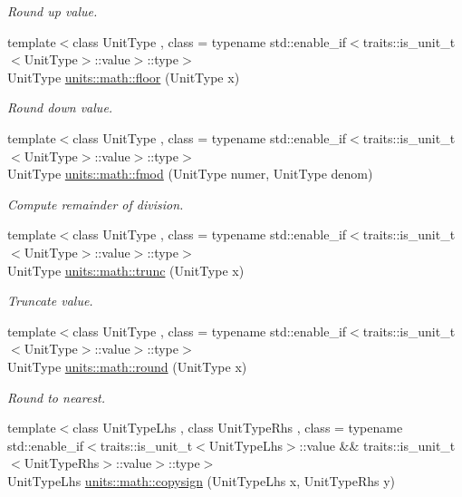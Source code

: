 \begin{DoxyCompactItemize}
\begin{DoxyCompactList}\small\item\em Round up value. \end{DoxyCompactList}\item 
{\footnotesize template$<$class Unit\+Type , class  = typename std\+::enable\+\_\+if$<$traits\+::is\+\_\+unit\+\_\+t$<$\+Unit\+Type$>$\+::value$>$\+::type$>$ }\\Unit\+Type \hyperlink{group___unit_math_ga510fabc531dbfe8ee911a4a255159bd0}{units\+::math\+::floor} (Unit\+Type x)
\begin{DoxyCompactList}\small\item\em Round down value. \end{DoxyCompactList}\item 
{\footnotesize template$<$class Unit\+Type , class  = typename std\+::enable\+\_\+if$<$traits\+::is\+\_\+unit\+\_\+t$<$\+Unit\+Type$>$\+::value$>$\+::type$>$ }\\Unit\+Type \hyperlink{group___unit_math_ga1184575106fc9286c1f3d5f8b1754b80}{units\+::math\+::fmod} (Unit\+Type numer, Unit\+Type denom)
\begin{DoxyCompactList}\small\item\em Compute remainder of division. \end{DoxyCompactList}\item 
{\footnotesize template$<$class Unit\+Type , class  = typename std\+::enable\+\_\+if$<$traits\+::is\+\_\+unit\+\_\+t$<$\+Unit\+Type$>$\+::value$>$\+::type$>$ }\\Unit\+Type \hyperlink{group___unit_math_ga11b5f95c32479536aefd08bba4009121}{units\+::math\+::trunc} (Unit\+Type x)
\begin{DoxyCompactList}\small\item\em Truncate value. \end{DoxyCompactList}\item 
{\footnotesize template$<$class Unit\+Type , class  = typename std\+::enable\+\_\+if$<$traits\+::is\+\_\+unit\+\_\+t$<$\+Unit\+Type$>$\+::value$>$\+::type$>$ }\\Unit\+Type \hyperlink{group___unit_math_ga24ed7e40e8b06b4d6b9d5e990844adde}{units\+::math\+::round} (Unit\+Type x)
\begin{DoxyCompactList}\small\item\em Round to nearest. \end{DoxyCompactList}\item 
{\footnotesize template$<$class Unit\+Type\+Lhs , class Unit\+Type\+Rhs , class  = typename std\+::enable\+\_\+if$<$traits\+::is\+\_\+unit\+\_\+t$<$\+Unit\+Type\+Lhs$>$\+::value \&\& traits\+::is\+\_\+unit\+\_\+t$<$\+Unit\+Type\+Rhs$>$\+::value$>$\+::type$>$ }\\Unit\+Type\+Lhs \hyperlink{group___unit_math_ga1006f33c11405e5cbc5a103d41df07a0}{units\+::math\+::copysign} (Unit\+Type\+Lhs x, Unit\+Type\+Rhs y)

\end{DoxyCompactItemize}
